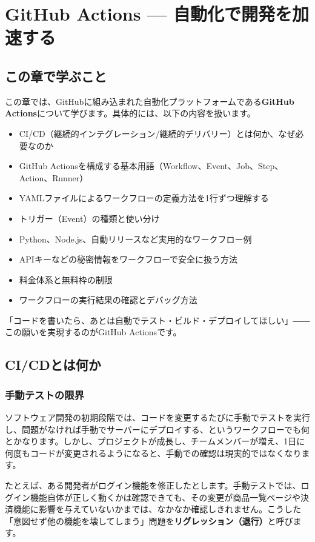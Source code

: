 \chapter{GitHub Actions --- 自動化で開発を加速する}

\section{この章で学ぶこと}

この章では、GitHubに組み込まれた自動化プラットフォームである\textbf{GitHub Actions}について学びます。具体的には、以下の内容を扱います。

\begin{itemize}
  \item CI/CD（継続的インテグレーション/継続的デリバリー）とは何か、なぜ必要なのか
  \item GitHub Actionsを構成する基本用語（Workflow、Event、Job、Step、Action、Runner）
  \item YAMLファイルによるワークフローの定義方法を1行ずつ理解する
  \item トリガー（Event）の種類と使い分け
  \item Python、Node.js、自動リリースなど実用的なワークフロー例
  \item APIキーなどの秘密情報をワークフローで安全に扱う方法
  \item 料金体系と無料枠の制限
  \item ワークフローの実行結果の確認とデバッグ方法
\end{itemize}

「コードを書いたら、あとは自動でテスト・ビルド・デプロイしてほしい」――この願いを実現するのがGitHub Actionsです。

\section{CI/CDとは何か}

\subsection{手動テストの限界}

ソフトウェア開発の初期段階では、コードを変更するたびに手動でテストを実行し、問題がなければ手動でサーバーにデプロイする、というワークフローでも何とかなります。しかし、プロジェクトが成長し、チームメンバーが増え、1日に何度もコードが変更されるようになると、手動での確認は現実的ではなくなります。

たとえば、ある開発者がログイン機能を修正したとします。手動テストでは、ログイン機能自体が正しく動くかは確認できても、その変更が商品一覧ページや決済機能に影響を与えていないかまでは、なかなか確認しきれません。こうした「意図せず他の機能を壊してしまう」問題を\textbf{リグレッション（退行）}と呼びます。

